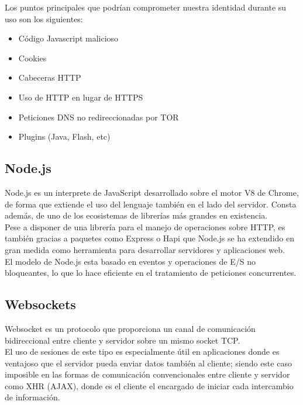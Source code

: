 Los puntos principales que podrían comprometer nuestra identidad durante su uso son los siguientes: \\

\begin{itemize}  
	\item  Código Javascript malicioso
	\item  Cookies
	\item  Cabeceras HTTP
	\item  Uso de HTTP en lugar de HTTPS
	\item Peticiones DNS no redireccionadas por TOR
	\item  Plugins (Java, Flash, etc)
\end{itemize}

\subsection {Node.js}

Node.js es un interprete de JavaScript desarrollado sobre el motor V8 de Chrome, de forma que extiende el uso del lenguaje también en el lado del servidor. Consta además, de uno de los ecosistemas de librerías más grandes en existencia. \\

Pese a disponer de una librería para el manejo de operaciones sobre HTTP, es también gracias a paquetes como Express o Hapi que Node.js se ha extendido en gran medida como herramienta para desarrollar servidores y aplicaciones web. \\
El modelo de Node.js esta basado en eventos y operaciones de E/S no bloqueantes, lo que lo hace eficiente en el tratamiento de peticiones concurrentes.

\subsection {Websockets}

Websocket es un protocolo que proporciona un canal de comunicación bidireccional entre cliente y servidor sobre un mismo socket TCP. \\

El uso de sesiones de este tipo es especialmente útil en aplicaciones donde es ventajoso que el servidor pueda enviar datos también al cliente; siendo este caso imposible en las formas de comunicación convencionales entre cliente y servidor como XHR (AJAX), donde es el cliente el encargado de iniciar cada intercambio de información. \\

